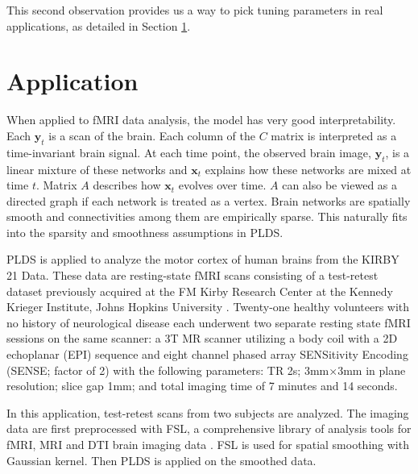 \documentclass[fleqn]{article}
\let\oldref\ref
\renewcommand{\ref}[1]{(\oldref{#1})}
\begin{document}
This second observation provides us a way to pick tuning parameters in real applications, as detailed in Section \oldref{sec:application}.



\section{Application}
\label{sec:application}
When applied to fMRI data analysis, the model has very good interpretability. Each $\mathbf{y}_t$ is a scan of the brain. Each column of the $C$ matrix is interpreted as a time-invariant brain signal. At each time point, the observed brain image, $\mathbf{y}_t$, is a linear mixture of these networks and $\mathbf{x}_t$ explains how these networks are mixed at time $t$. Matrix $A$ describes how $\mathbf{x}_t$ evolves over time. $A$ can also be viewed as a directed graph if each network is treated as a vertex. Brain networks are spatially smooth and connectivities among them are empirically sparse. This naturally fits into the sparsity and smoothness assumptions in PLDS.

PLDS is applied to analyze the motor cortex of human brains from the KIRBY 21 Data. These data are resting-state fMRI scans consisting of a test-retest dataset previously acquired at the FM Kirby Research Center at the Kennedy Krieger Institute, Johns Hopkins University \cite{landman2011multi}. Twenty-one healthy volunteers with no history of neurological disease each underwent two separate resting state fMRI sessions on the same scanner: a 3T MR scanner utilizing a body coil with a 2D echoplanar (EPI) sequence and eight channel phased array SENSitivity Encoding (SENSE; factor of 2) with the following parameters: TR 2s; 3mm$\times$3mm in plane resolution; slice gap 1mm; and total imaging time of 7 minutes and 14 seconds.

In this application, test-retest scans from two subjects are analyzed. The imaging data are first preprocessed with FSL, a comprehensive library of analysis tools for fMRI, MRI and DTI brain imaging data \cite{smith2004advances}. FSL is used for spatial smoothing with Gaussian kernel. Then PLDS is applied on the smoothed data.
\end{document}
